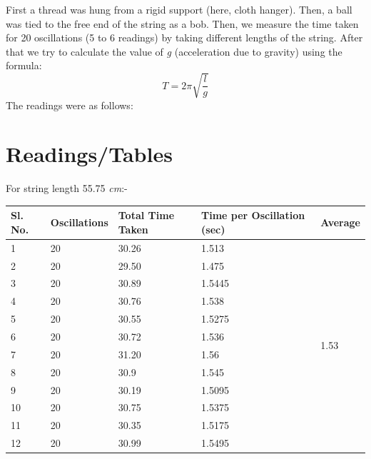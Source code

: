 \documentclass[12pt]{article}
\begin{document}
	
	First a thread was hung from a rigid support (here, cloth hanger). Then, a ball was tied to the free end of the string as a bob. Then, we measure the time taken for 20 oscillations (5 to 6 readings) by taking different lengths of the string. After that we try to calculate the value of \emph{g} (acceleration due to gravity) using the formula: $$T = 2\pi \sqrt{\frac{l}{g}}$$The readings were as follows:
	
	\section{Readings/Tables}
	
	For string length 55.75 \emph{cm}:-
	
	\begin{table}[H]
		\begin{tabular}{|l|l|l|l|l|}
			\hline
			Sl. No. & Oscillations & Total Time Taken & Time per Oscillation (sec) & Average                \\ \hline
			1       & 20           & 30.26            & 1.513                      & \multirow{12}{*}{1.53} \\ \cline{1-4}
			2       & 20           & 29.50            & 1.475                      &                        \\ \cline{1-4}
			3       & 20           & 30.89            & 1.5445                     &                        \\ \cline{1-4}
			4       & 20           & 30.76            & 1.538                      &                        \\ \cline{1-4}
			5       & 20           & 30.55            & 1.5275                     &                        \\ \cline{1-4}
			6       & 20           & 30.72            & 1.536                      &                        \\ \cline{1-4}
			7       & 20           & 31.20            & 1.56                       &                        \\ \cline{1-4}
			8       & 20           & 30.9             & 1.545                      &                        \\ \cline{1-4}
			9       & 20           & 30.19            & 1.5095                     &                        \\ \cline{1-4}
			10      & 20           & 30.75            & 1.5375                     &                        \\ \cline{1-4}
			11      & 20           & 30.35            & 1.5175                     &                        \\ \cline{1-4}
			12      & 20           & 30.99            & 1.5495                     &                        \\ \hline
		\end{tabular}
	\end{table}
\end{document}
